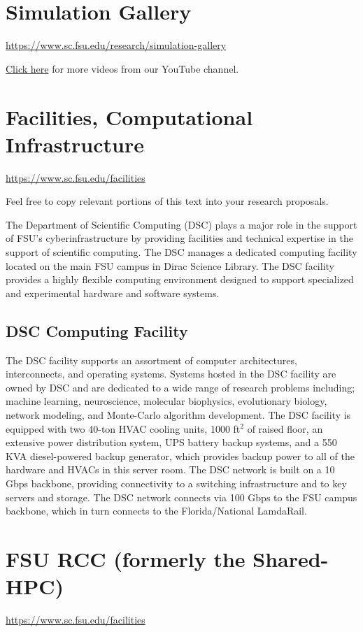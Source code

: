 \documentclass[12pt,a4paper]{article}
\begin{document}
\section{Simulation Gallery}
\url{https://www.sc.fsu.edu/research/simulation-gallery}

\href{https://www.youtube.com/channel/UC5fC52_j8y-77hTANNlC-Xw}{Click here} for more videos from our YouTube channel.

\section{Facilities, Computational Infrastructure}
\url{https://www.sc.fsu.edu/facilities}

Feel free to copy relevant portions of this text into your research proposals.

The Department of Scientific Computing (DSC) plays a major role in the support of FSU's cyberinfrastructure by providing facilities and technical expertise in the support of scientific computing. The DSC manages a dedicated computing facility located on the main FSU campus in Dirac Science Library. The DSC facility provides a highly flexible computing environment designed to support specialized and experimental hardware and software systems.

\subsection{DSC Computing Facility}
The DSC facility supports an assortment of computer architectures, interconnects, and operating systems. Systems hosted in the DSC facility are owned by DSC and are dedicated to a wide range of research problems including; machine learning, neuroscience, molecular biophysics, evolutionary biology, network modeling, and Monte-Carlo algorithm development. The DSC facility is equipped with two 40-ton HVAC cooling units, 1000 ft$^2$ of raised floor, an extensive power distribution system, UPS battery backup systems, and a 550 KVA diesel-powered backup generator, which provides backup power to all of the hardware and HVACs in this server room. The DSC network is built on a 10 Gbps backbone, providing connectivity to a switching infrastructure and to key servers and storage. The DSC network connects via 100 Gbps to the FSU campus backbone, which in turn connects to the Florida/National LamdaRail.

\section{FSU RCC (formerly the Shared-HPC)}
\url{https://www.sc.fsu.edu/facilities}
\end{document}

